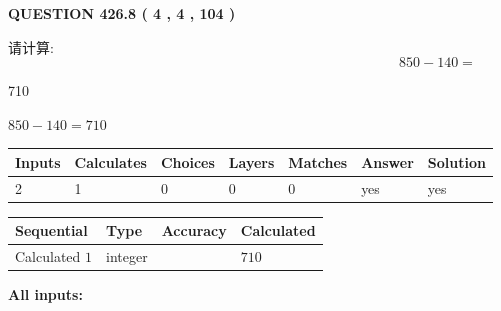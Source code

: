 \documentclass{ctexart}
\begin{document}
{\textbf{\Large{QUESTION
426.8 
 ( 4 , 4 , 104 )
}}}
  
  
 
请计算:
\begin{equation}
850 -   %
140 = \nonumber
\end{equation}
 
 
 
\noindent{}
 
 

710
 
 
\noindent{}
 
 

 
 
 
\noindent{}
 
 

$ %
850 -  %
140=   %
710$
 
 
\noindent{}
 
 

 
   
   
   
   
\noindent\begin{tabular}{|l|l|l|l|l|l|l|}
 \hline
Inputs & Calculates & Choices & Layers & Matches & Answer & Solution \\ \hline
 2  & 
 1  & 
 0
  & 
 0  & 
 0  & 
  yes & 
  yes 
  \\ \hline
 \end{tabular}
   
   
   
   
\noindent{}
   
   
  
  
\noindent\begin{tabular}{|l|l|l|l|}
\hline
 Sequential & Type & Accuracy & Calculated \\ 
\hline
 
 
  Calculated $  1 $ & integer &  & 
  $ 710 $ 
 \\  \hline  
 \end{tabular}
   
   
   
   
\noindent\vspace{0.1in}\hspace{-0.08in} {\textbf{\Large{All inputs: }}}
   
\end{document}
